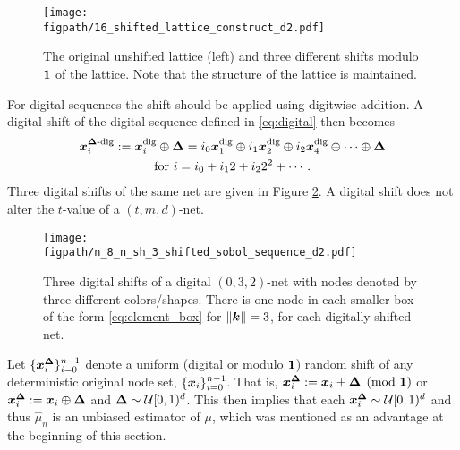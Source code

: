 \documentclass{svproc}
\newcommand{\figpath}{Figures}
\begin{document}
\begin{figure}
	\centering
	\texttt{[image: \\figpath/16\_shifted\_lattice\_construct\_d2.pdf]}
	\caption{The original unshifted lattice (left) and three different shifts modulo ${\boldsymbol{1}}$ of the lattice.  Note that the structure of the lattice is maintained. \label{fig:shift_lat}}
\end{figure}

For digital sequences the shift should be applied using digitwise addition.  A digital shift of the digital sequence defined in  \eqref{eq:digital} then becomes
\begin{multline} \label{eq:sh_digital}
	{\boldsymbol{x}}_i^{{\boldsymbol{\Delta}}\text{-dig}} := {\boldsymbol{x}}_i^{\text{dig}} \oplus {\boldsymbol{\Delta}} = i_0 {\boldsymbol{x}}^{\text{dig}}_1 \oplus i_1 {\boldsymbol{x}}^{\text{dig}}_2 \oplus i_2 {\boldsymbol{x}}^{\text{dig}}_4 \oplus \cdots \oplus {\boldsymbol{\Delta}} \\
    \text{for }
	i = i_0 + i_12 + i_2 2^2 + \cdots.
\end{multline}
Three digital shifts of the same net are given in Figure \ref{fig:shift_net}.  A digital shift does not alter the $t$-value of a $(t,m,d)$-net.

\begin{figure}
	\centering
	\texttt{[image: \\figpath/n\_8\_n\_sh\_3\_shifted\_sobol\_sequence\_d2.pdf]}
	\caption{Three digital shifts of a digital $(0,3,2)$-net with nodes denoted by three different colors/shapes.  There is one node in each smaller box of the form \eqref{eq:element_box} for $\lVert {\boldsymbol{k}} \rVert = 3$, for each digitally shifted net. \label{fig:shift_net}}
\end{figure}

Let $\{{\boldsymbol{x}}_i^{{\boldsymbol{\Delta}}}\}_{i=0}^{n-1}$ denote a uniform (digital or modulo ${\boldsymbol{1}}$) random shift of any deterministic original node set, $\{{\boldsymbol{x}}_i \}_{i=0}^{n-1}$.  That is, ${\boldsymbol{x}}_i^{{\boldsymbol{\Delta}}} : = {\boldsymbol{x}}_i + {\boldsymbol{\Delta}} \pmod {{\boldsymbol{1}}}$ or  ${\boldsymbol{x}}_i^{{\boldsymbol{\Delta}}} : = {\boldsymbol{x}}_i \oplus {\boldsymbol{\Delta}}$ and ${\boldsymbol{\Delta}} \sim {\mathcal{U}}[0,1)^d$. This then implies that each ${\boldsymbol{x}}_i^{{\boldsymbol{\Delta}}} \sim {\mathcal{U}}[0,1)^d$ and thus $\hat{\mu}_n$ is an unbiased estimator of $\mu$, which was mentioned as an advantage at the beginning of this section.
\end{document}
